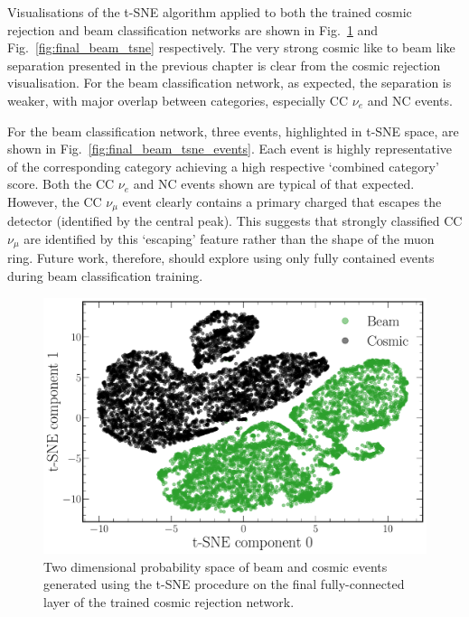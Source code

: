 Visualisations of the t-SNE algorithm applied to both the trained cosmic rejection and beam
classification networks are shown in Fig.~\ref{fig:final_cosmic_tsne} and
Fig.~\ref{fig:final_beam_tsne} respectively. The very strong cosmic like to beam like separation
presented in the previous chapter is clear from the cosmic rejection visualisation. For the beam
classification network, as expected, the separation is weaker, with major overlap between
categories, especially CC $\nu_{e}$ and NC events.

For the beam classification network, three events, highlighted in t-SNE space, are shown in
Fig.~\ref{fig:final_beam_tsne_events}. Each event is highly representative of the corresponding
category achieving a high respective `combined category' score. Both the CC $\nu_{e}$ and NC
events shown are typical of that expected. However, the CC $\nu_{\mu}$ event clearly contains a
primary charged that escapes the detector (identified by the central peak). This suggests that
strongly classified CC $\nu_{\mu}$ are identified by this `escaping' feature rather than the shape
of the muon ring. Future work, therefore, should explore using only fully contained events during
beam classification training.

\begin{figure} %
    \includegraphics[width=\textwidth]{diagrams/7-results/final_cosmic_tsne.pdf}
    \caption[Cosmic rejection network t-SNE space]
    {Two dimensional probability space of beam and cosmic events generated using the t-SNE
        procedure on the final fully-connected layer of the trained cosmic rejection network.}
    \label{fig:final_cosmic_tsne}
\end{figure}

